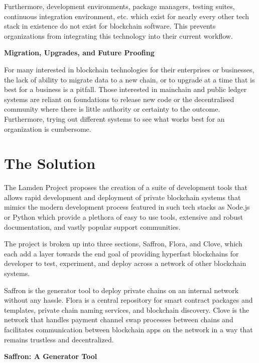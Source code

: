 \documentclass{%
	article}
\begin{document}
Furthermore, development environments, package managers, testing suites, continuous integration environment, etc. which exist for nearly every other tech stack in existence do not exist for blockchain software. This prevents organizations from integrating this technology into their current workflow.

\begin{center}
\textbf{Migration, Upgrades, and Future Proofing}
\end{center}

For many interested in blockchain technologies for their enterprises or businesses, the lack of ability to migrate data to a new chain, or to upgrade at a time that is best for a business is a pitfall. Those interested in mainchain and public ledger systems are reliant on foundations to release new code or the decentralised community where there is little authority or certainty to the outcome. Furthermore, trying out different systems to see what works best for an organization is cumbersome.

\section{The Solution}

The Lamden Project proposes the creation of a suite of development tools that allows rapid development and deployment of private blockchain systems that mimics the modern development process featured in such tech stacks as Node.js or Python which provide a plethora of easy to use tools, extensive and robust documentation, and vastly popular support communities.

The project is broken up into three sections, Saffron, Flora, and Clove, which each add a layer towards the end goal of providing hyperfast blockchains for developer to test, experiment, and deploy across a network of other blockchain systems.

Saffron is the generator tool to deploy private chains on an internal network without any hassle. Flora is a central repository for smart contract packages and templates, private chain naming services, and blockchain discovery. Clove is the network that handles payment channel swap processes between chains and facilitates communication between blockchain apps on the network in a way that remains trustless and decentralized.

\begin{center}
\textbf{Saffron: A Generator Tool}
\end{center}
\end{document}
